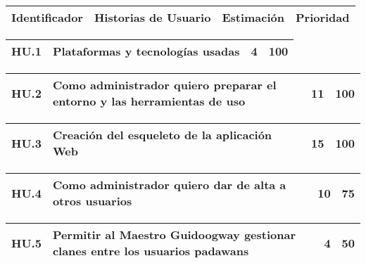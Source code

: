 \begin{table}[h]
	\centering
	\begin{tabular}{| p{2.3cm} | p{5.1cm} | p{2cm} | p{1.6cm} |}
		\rowcolor[HTML]{329A9D} 
		{\color[HTML]{FFFFFF} \textbf{Identificador}} & {\color[HTML]{FFFFFF} \textbf{Historias de Usuario}} & {\color[HTML]{FFFFFF} \textbf{Estimación}} & {\color[HTML]{FFFFFF} \textbf{Prioridad}} \\ \hline
	\end{tabular}
\end{table}

\begin{table}[h]
	\centering
	\begin{tabular}{| p{2.3cm} | p{5.1cm} | p{2cm} | p{1.6cm} |}
		\hline 
		HU.1 & Plataformas y tecnologías usadas & 4 & 100 \\ \hline 
	\end{tabular}
\end{table}    

\begin{table}[h]
	\centering
	\begin{tabular}{| p{2.3cm} | p{5.1cm} | p{2cm} | p{1.6cm} |}
		\hline 
		HU.2 & Como administrador quiero preparar el
		entorno y las herramientas de uso & 11 & 100 \\ \hline 
	\end{tabular}
\end{table}   

\begin{table}[h]
	\centering
	\begin{tabular}{| p{2.3cm} | p{5.1cm} | p{2cm} | p{1.6cm} |}
		\hline 
		HU.3 & Creación del esqueleto de la aplicación Web & 15 & 100 \\ \hline 
	\end{tabular}
\end{table}   

\begin{table}[h]
	\centering
	\begin{tabular}{| p{2.3cm} | p{5.1cm} | p{2cm} | p{1.6cm} |}
		\hline 
		HU.4 & Como administrador quiero dar de alta a otros usuarios & 10 & 75 \\ \hline 
	\end{tabular}
\end{table}   


\begin{table}[h]
	\centering
	\begin{tabular}{| p{2.3cm} | p{5.1cm} | p{2cm} | p{1.6cm} |}
		\hline 
		HU.5 & Permitir al Maestro Guidoogway gestionar clanes entre los usuarios padawans & 4 & 50 \\ \hline 
	\end{tabular}
\end{table}   

